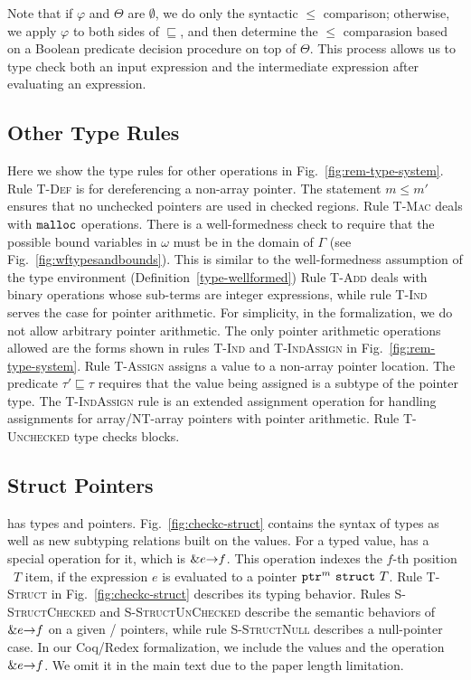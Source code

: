 Note that if $\varphi$ and $\Theta$ are $\emptyset$, we do only the
syntactic $\le$ comparison; otherwise, we apply $\varphi$ to both
sides of $\sqsubseteq$, and then determine the $\le$ comparasion based
on a Boolean predicate decision procedure on top of $\Theta$. This
process allows us to type check both an input expression and the
intermediate expression after evaluating an expression. 

\subsection{Other Type Rules}\label{rem-type}

Here we show the type rules for other \checkedc operations in Fig.~\ref{fig:rem-type-system}.
Rule \textsc{T-Def} is for dereferencing a non-array pointer. 
The statement $m \leq m'$ ensures that no unchecked pointers are used in checked regions.
Rule \textsc{T-Mac} deals with
$\emalloctext$ operations. There is a well-formedness check to require
that the possible bound variables in $\omega$ must be in the domain of
$\Gamma$ (see Fig.~\ref{fig:wftypesandbounds}). This is similar to the well-formedness assumption of the type environment (Definition~\ref{type-wellformed}) Rule \textsc{T-Add} deals with binary operations whose sub-terms are integer expressions, while rule \textsc{T-Ind} serves the case for pointer arithmetic. For simplicity, in the \checkedc formalization, we do not allow arbitrary pointer arithmetic. The only pointer arithmetic operations allowed are the forms shown in rules \textsc{T-Ind} and \textsc{T-IndAssign} in Fig.~\ref{fig:rem-type-system}. Rule \textsc{T-Assign} assigns a value to a non-array pointer location. The predicate $\tau'\sqsubseteq \tau$ requires that the value being assigned is a subtype of the pointer type.
The \textsc{T-IndAssign} rule is an extended assignment operation for handling assignments for array/NT-array pointers with pointer arithmetic. Rule \textsc{T-Unchecked} type checks  blocks.

\subsection{Struct Pointers}\label{appx:struct}

\checkedc has  types and  pointers. Fig.~\ref{fig:checkc-struct} contains the syntax of  types as well as new subtyping relations built on the  values.
For a  typed value, \checkedc has a special operation for it, which is $\eamper{e}{f}$. This operation indexes the $f$-th position ~$T$ item, if the expression $e$ is evaluated to a  pointer $\tptr{\tstruct{T}}{m}$. Rule \textsc{T-Struct} in Fig.~\ref{fig:checkc-struct} describes its typing behavior.
Rules \textsc{S-StructChecked} and \textsc{S-StructUnChecked} describe the semantic behaviors of $\eamper{e}{f}$ on a given  / pointers, while rule \textsc{S-StructNull} describes a   null-pointer case.
In our Coq/Redex formalization, we include the  values and the operation $\eamper{e}{f}$. We omit it in the main text due to the paper length limitation.

